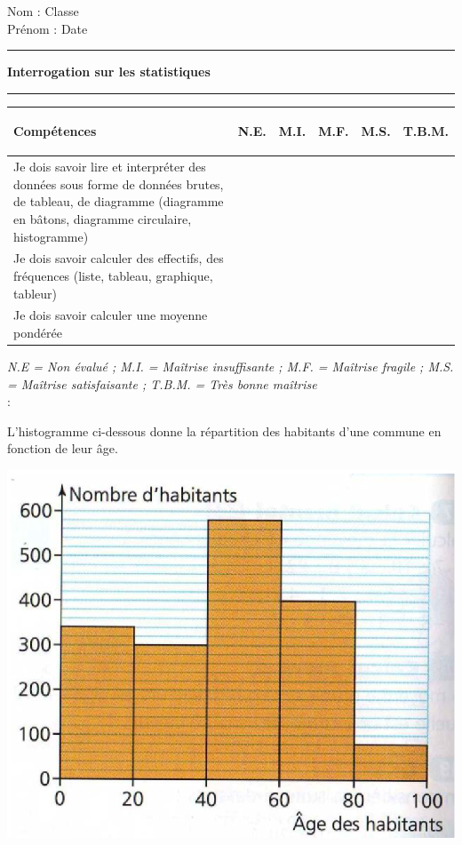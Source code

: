 \documentclass[a4paper,11pt]{article}
\newcounter{numexo}
\newcommand{\exo}[1]{\stepcounter{numexo}\noindent{\bf Exercice~\thenumexo} : \marginpar{\hfill /#1}}
\newcommand{\titre}[5] 
{
\noindent #2 \hfill #4 \\
#3 \hfill #5

\vspace{-1.6cm}

\begin{center}\rule{6cm}{0.5mm}\end{center}
\vspace{0.2cm}
\begin{center}{\large{\textbf{#1}}}\end{center}
\begin{center}\rule{6cm}{0.5mm}\end{center}
}
\begin{document}
\pagestyle{empty}
\titre{Interrogation sur les statistiques}{Nom :}{Prénom :}{Classe}{Date}

\begin{flushleft}
\begin{tabular}{|m{9.5cm}|m{1.25cm}|m{1.25cm}|m{1.25cm}|m{1.25cm}|m{1.25cm}|}
\hline 
\textbf{Compétences} & \begin{center}
\textbf{N.E.}
\end{center} & \begin{center}
\textbf{M.I.}
\end{center} & \begin{center}
\textbf{M.F.}
\end{center}  & \begin{center}
\textbf{M.S.}
\end{center} & \begin{center}
\textbf{T.B.M.}
\end{center} \\ 
\hline 
Je dois savoir  lire et interpréter des données sous forme de données brutes, de tableau, de diagramme (diagramme en bâtons, diagramme circulaire, histogramme) &  &  & & &\\
\hline 
Je dois savoir calculer des effectifs, des fréquences (liste, tableau, graphique, tableur) &  &  & & &\\
\hline
Je dois savoir calculer une moyenne pondérée &  &  & & &\\
\hline
\end{tabular} 
\end{flushleft}

\textit{N.E = Non évalué ; M.I. = Maîtrise insuffisante ; M.F. = Maîtrise fragile ; M.S. = Maîtrise satisfaisante ; T.B.M. = Très bonne maîtrise}\\

\exo{8}

L'histogramme ci-dessous donne la répartition des habitants d'une commune en fonction de leur âge. 

\begin{center}
\includegraphics[scale=0.7]{interro1.eps} 
\end{center}
\end{document}
